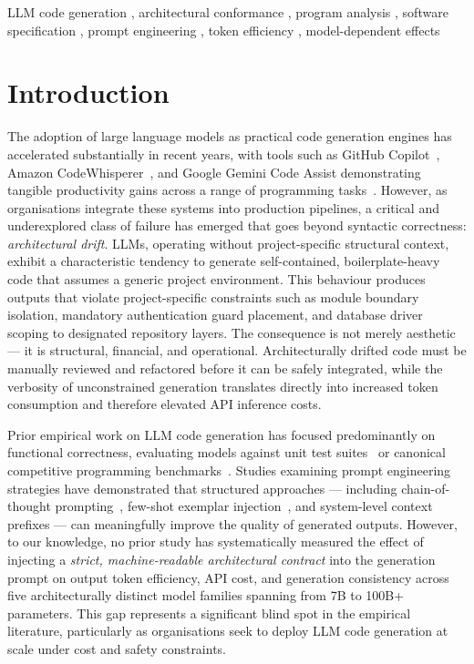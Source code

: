 \documentclass[review,12pt,3p]{elsarticle}
\begin{document}
\begin{frontmatter}
\begin{keyword}
LLM code generation \sep
architectural conformance \sep
program analysis \sep
software specification \sep
prompt engineering \sep
token efficiency \sep
model-dependent effects
\end{keyword}

\end{frontmatter}

\linenumbers

\section{Introduction}
\label{sec:intro}

The adoption of large language models as practical code generation engines has accelerated
substantially in recent years, with tools such as GitHub Copilot~\citep{Copilot2022},
Amazon CodeWhisperer~\citep{CodeWhisperer2023}, and Google Gemini Code Assist demonstrating
tangible productivity gains across a range of programming tasks~\citep{Ziegler2022Productivity}.
However, as organisations integrate these systems into production pipelines, a
critical and underexplored class of failure has emerged that goes beyond syntactic
correctness: \emph{architectural drift}. LLMs, operating without project-specific
structural context, exhibit a characteristic tendency to generate self-contained,
boilerplate-heavy code that assumes a generic project environment. This behaviour produces
outputs that violate project-specific constraints such as module boundary isolation,
mandatory authentication guard placement, and database driver scoping to designated
repository layers. The consequence is not merely aesthetic --- it is structural, financial,
and operational. Architecturally drifted code must be manually reviewed and refactored
before it can be safely integrated, while the verbosity of unconstrained generation
translates directly into increased token consumption and therefore elevated API inference
costs.

Prior empirical work on LLM code generation has focused predominantly on functional
correctness, evaluating models against unit test suites~\citep{Chen2021HumanEval,
Austin2021MBPP} or canonical competitive programming
benchmarks~\citep{Li2022AlphaCode}. Studies examining prompt engineering strategies have
demonstrated that structured approaches --- including chain-of-thought
prompting~\citep{Wei2022ChainOfThought}, few-shot exemplar injection~\citep{Brown2020GPT3},
and system-level context prefixes --- can meaningfully improve the quality of generated
outputs. However, to our knowledge, no prior study has systematically measured the effect
of injecting a \emph{strict, machine-readable architectural contract} into the generation
prompt on output token efficiency, API cost, and generation consistency across five architecturally
distinct model families spanning from 7B to 100B+ parameters. This gap represents a significant
blind spot in the empirical literature, particularly as organisations seek to deploy
LLM code generation at scale under cost and safety constraints.
\end{document}
